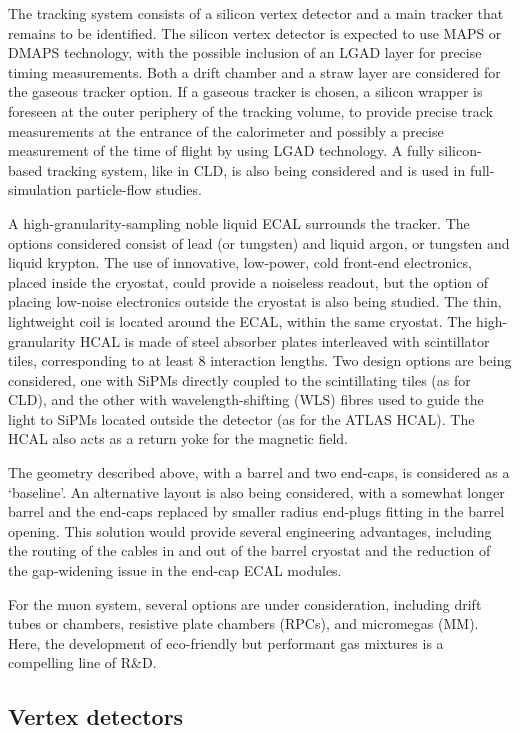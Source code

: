 The tracking system consists of a silicon vertex detector and a main tracker that remains to be identified. 
The silicon vertex detector is expected to use  MAPS or DMAPS technology, 
with the possible inclusion of an LGAD layer for precise timing measurements. 
Both a drift chamber and a straw layer are considered for the gaseous tracker option.
If a gaseous tracker is chosen, a silicon wrapper is foreseen at the outer periphery of the tracking volume,
to provide precise track measurements at the entrance of the calorimeter
and possibly a precise measurement of the time of flight by using LGAD technology.
A fully silicon-based tracking system, like in CLD, is also being considered 
and is used in full-simulation particle-flow studies. 

A high-granularity-sampling noble liquid ECAL surrounds the tracker. 
The options considered consist of lead (or tungsten) and liquid argon, or tungsten and liquid krypton.  
The use of innovative, low-power, cold front-end electronics, placed inside the cryostat, could provide a noiseless readout, 
but the option of placing low-noise electronics outside the cryostat is also being studied. 
The thin, lightweight coil is located around the ECAL, within the same cryostat. 
The high-granularity HCAL
is made of steel absorber plates interleaved with scintillator tiles, 
corresponding to at least 8 interaction lengths.
Two design options are being considered, 
one with SiPMs directly coupled to the scintillating tiles (as for CLD), 
and the other with wavelength-shifting (WLS) fibres used to guide the light to SiPMs located outside the detector (as for the ATLAS HCAL).
The HCAL also acts as a return yoke for the magnetic field.

The geometry described above, with a barrel and two end-caps, is considered as a `baseline'.
An alternative layout is also being considered, 
with a somewhat longer barrel and the end-caps replaced by smaller radius end-plugs fitting in the barrel opening. 
This solution would provide several engineering advantages, 
including the routing of the cables in and out of the barrel cryostat
and the reduction of the gap-widening issue in the end-cap ECAL modules. 

For the muon system, several options are under consideration,
including drift tubes or chambers, resistive plate chambers (RPCs), and micromegas (MM). 
Here, the development of eco-friendly but performant gas mixtures is a compelling line of R\&D.

\subsection{Vertex detectors}
\label{sec:IDEA_vertex}

